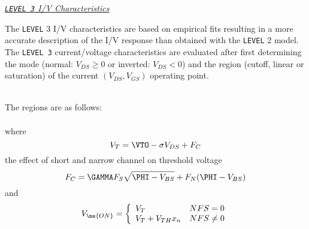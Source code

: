 \noindent\underline{\sl {\tt LEVEL 3} I/V Characteristics}
  
     

The {\tt LEVEL} 3 I/V characteristics are based on empirical fits
resulting in a more accurate description of the I/V response than
obtained with the {\tt LEVEL} 2 model. The {\tt LEVEL 3}
current/voltage characteristics are evaluated after first
determining the mode (normal: $V_{DS} \ge 0$ or inverted: $V_{DS}
< 0$) and the region (cutoff, linear or saturation) of the current
$(V_{DS}, V_{GS})$ operating point.

\\[0.2in]
The regions are as follows:\\[0.1in]
\hspace*{\fill}\\
where
\begin{equation}
V_T = \VTO - \sigma V_{DS} + F_C
\end{equation}
the effect of short and narrow channel on threshold voltage
\begin{equation}
F_C = \GAMMA F_S\sqrt{\PHI- V_{BS}}
         + F_N(\PHI - V_{BS})
\label{eqn:fc:level3}
\end{equation}
and
\begin{equation}
V_{\ms{ON}} = \left\{ \begin{array}{ll}
     V_T             & NFS = 0\\
     V_T + V_{TH}x_n & NFS \ne 0
     \end{array} \right. %
\end{equation}

